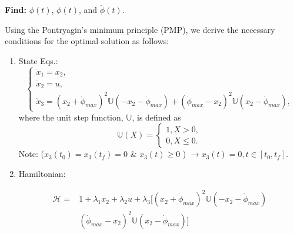 \documentclass[letterpaper, preprint, paper,11pt]{AAS}	%
\begin{document}
			{\bf Find:} $\phi(t)$, $\dot{\phi}(t)$, and $\ddot{\phi}(t)$.

			
			Using the Pontryagin's minimum principle (PMP), we derive the necessary conditions for the optimal solution as follows:
			\begin{enumerate}
				\item State Eqs.:
				\begin{equation}
					\left\{
					\begin{array}{l}
					\dot{x}_1=x_2, \\
					\dot{x}_2=u, \\
					\dot{x}_3=(x_2+\dot{\phi}_{max})^2\mathbb{U}(-x_2-\dot{\phi}_{max})+(\dot{\phi}_{max}-x_2)^2\mathbb{U}(x_2-\dot{\phi}_{max}),
					\end{array}
					\right.
				\end{equation}
				where the unit step function, $\mathbb{U}$, is defined as
				\begin{equation}
					\mathbb{U}(X)=\left\{
					\begin{array}{l}
					1,   X>0, \\
					0,   X\leq 0.
					\end{array}
					\right.
				\end{equation}
				Note:  ($x_3(t_0)=x_3(t_f)=0$ \& $x_3(t)\geq 0$ ) $\rightarrow x_3(t)=0, t\in[t_0, t_f]$. 
				
				\item Hamiltonian:
				
				\begin{equation}
					\begin{split}
					\mathscr{H}=& 1+\lambda_1x_2+\lambda_2u+\lambda_3\Big[(x_2+\dot{\phi}_{max})^2\mathbb{U}(-x_2-\dot{\phi}_{max})\\
				    	& (\dot{\phi}_{max}-x_2)^2\mathbb{U}(x_2-\dot{\phi}_{max})\Big]
					\end{split}
				\end{equation}
			\end{enumerate}

			
\end{document}
